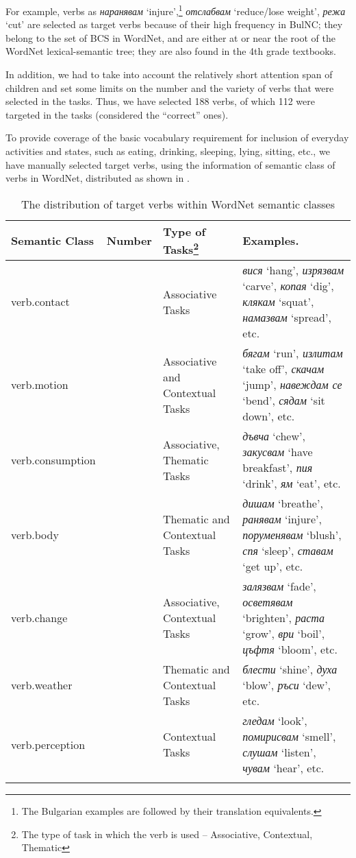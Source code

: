\documentclass[output=paper,colorlinks,citecolor=brown]{langscibook}
\begin{document}
For example, verbs as \textit{наранявам} `injure',\footnote{The Bulgarian examples are followed by their translation equivalents.} \textit{отслабвам} `reduce/lose weight', \textit{режа} `cut' are selected as target verbs because of their high frequency in BulNC; they belong to the set of BCS in WordNet, and are either at or near the root of the WordNet lexical-semantic tree; they are also found in the 4th grade textbooks.

In addition, we had to take into account the relatively short attention span of children and set some limits on the number and the variety of verbs that were selected in the tasks. Thus, we have selected 188 verbs, of which 112 were targeted in the tasks (considered the ``correct'' ones).

To provide coverage of the basic vocabulary requirement for inclusion of everyday activities and states, such as eating, drinking, sleeping, lying, sitting, etc., we have manually selected target verbs, using the information of semantic class of verbs in WordNet, distributed as shown in .

\begin{table}
\begin{tabularx}{\textwidth}{llQQ}
\lsptoprule
Semantic Class & Number & Type of Tasks\footnote{The type of task in which the verb is used -- Associative, Contextual, Thematic} & Examples. \\
\midrule
verb.contact &  & Associative Tasks & \textit{вися} `hang', \textit{изрязвам} `carve', \textit{копая} `dig', \textit{клякам} `squat', \textit{намазвам} `spread', etc. \\\midrule
verb.motion &  &  Associative and Contextual Tasks & \textit{бягам} `run', \textit{излитам} `take off', \textit{скачам} `jump', \textit{навеждам се} `bend', \textit{сядам} `sit down',  etc.  \\\midrule
verb.consumption &  &  Associative, Thematic Tasks & \textit{дъвча} `chew', \textit{закусвам} `have breakfast', \textit{пия} `drink', \textit{ям} `eat', etc. \\\midrule
verb.body & & Thematic and Contextual Tasks & \textit{дишам} `breathe', \textit{ранявам} `injure', \textit{поруменявам} `blush', \textit{спя} `sleep', \textit{ставам} `get up', etc. \\\midrule
verb.change &  & Associative, Contextual Tasks & \textit{залязвам} `fade', \textit{осветявам} `brighten', \textit{раста} `grow', \textit{ври} `boil', \textit{цъфтя} `bloom', etc. \\\midrule
verb.weather  & &  Thematic and Contextual Tasks & \textit{блести} `shine', \textit{духа} `blow', \textit{ръси} `dew', etc. \\ \midrule
verb.perception  &  &  Contextual Tasks & \textit{гледам} `look', \textit{помирисвам} `smell', \textit{слушам} `listen', \textit{чувам} `hear', etc. \\
\lspbottomrule
\end{tabularx}
\caption{The distribution of target verbs within WordNet semantic classes}
\label{tab:chapterhandle:keytotable1}
\end{table}
\end{document}
